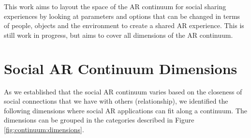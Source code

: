  


This work aims to layout the space of the AR continuum for social sharing experiences by looking at parameters and options that can be changed in terms of people, objects and the environment to create a shared AR experience. This is still work in progress, but aims to cover all dimensions of the AR continuum.

\section{Social AR Continuum Dimensions}

As we established that the social AR continuum varies based on the closeness of social connections that we have with others (relationship), we identified the following dimensions where social AR applications can fit along a continuum. The dimensions can be grouped in the categories described in Figure \ref{fig:continuum:dimensions}.

